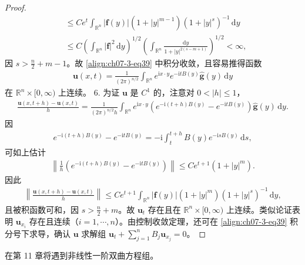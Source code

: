 \documentclass[../../main.tex]{subfiles}
\begin{document}
\begin{theorem}[解的存在性]
\begin{proof}
\begin{align*}
&\leqslant Ce^t\int_{\mathbb{R}^n}|\mathbf{f}(y)|(1+|y|^{m-1})(1+|y|^s)^{-1}\,\mathrm{d}y\\
&\leqslant C\left(\int_{\mathbb{R}^n}|\mathbf{f}|^2\,\mathrm{d}y\right)^{1/2}\left(\int_{\mathbb{R}^n}\frac{\mathrm{d}y}{1+|y|^{2(s-m+1)}}\right)^{1/2}<\infty,
\end{align*}
因 $s>\frac n2+m-1$。故 \eqref{align:ch07-3-eq39} 中积分收敛，且容易推得函数
\begin{align*}
\mathbf{u}(x,t)=\frac1{(2\pi)^{n/2}}\int_{\mathbb{R}^n}e^{\mathrm{i}x\cdot y}e^{-\mathrm{i}tB(y)}\widehat{\mathbf{g}}(y)\,\mathrm{d}y
\end{align*}
在 $\mathbb{R}^n\times[0,\infty)$ 上连续。
6. 为证 $\mathbf{u}$ 是 $C^1$ 的，注意对 $0<|h|\leqslant 1$，
\begin{align*}
\frac{\mathbf{u}(x,t+h)-\mathbf{u}(x,t)}h=\frac1{(2\pi)^{n/2}h}\int_{\mathbb{R}^n}e^{\mathrm{i}x\cdot y}\left(e^{-\mathrm{i}(t+h)B(y)}-e^{-\mathrm{i}tB(y)}\right)\widehat{\mathbf{g}}(y)\,\mathrm{d}y.
\end{align*}
因
\begin{align*}
e^{-\mathrm{i}(t+h)B(y)}-e^{-\mathrm{i}tB(y)}=-\mathrm{i}\int_t^{t+h}B(y)e^{-\mathrm{i}sB(y)}\,\mathrm{d}s,
\end{align*}
可如上估计
\begin{align*}
\left\|\frac1h\left(e^{-\mathrm{i}(t+h)B(y)}-e^{-\mathrm{i}tB(y)}\right)\right\|\leqslant Ce^{t+1}(1+|y|^m).
\end{align*}
因此
\begin{align*}
\left\|\frac{\mathbf{u}(x,t+h)-\mathbf{u}(x,t)}h\right\|\leqslant Ce^{t+1}\int_{\mathbb{R}^n}|\mathbf{f}(y)|(1+|y|^m)(1+|y|^s)^{-1}\,\mathrm{d}y,
\end{align*}
且被积函数可和，因 $s>\frac n2+m$。故 $\mathbf{u}_t$ 存在且在 $\mathbb{R}^n\times[0,\infty)$ 上连续。类似论证表明 $\mathbf{u}_{x_i}$ 存在且连续（$i=1,\cdots,n$）。由控制收敛定理，还可在 \eqref{align:ch07-3-eq39} 积分号下求导，确认 $\mathbf{u}$ 求解组 $\mathbf{u}_t+\sum_{j=1}^nB_j\mathbf{u}_{x_j}=0$。
\end{proof}
\end{theorem}

在第 11 章将遇到非线性一阶双曲方程组。
\end{document}
